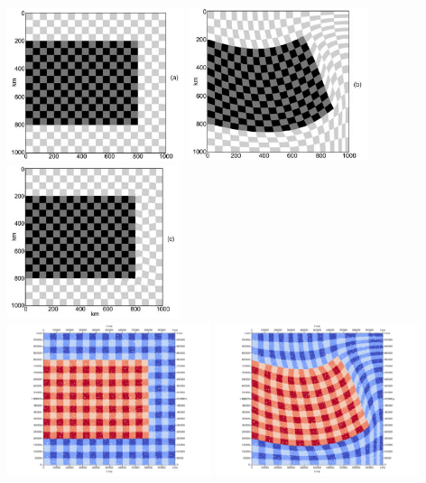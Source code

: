 \begin{center}
\includegraphics[height=4.5cm]{python_codes/fieldstone_64/images/gerya1}
\includegraphics[height=4.5cm]{python_codes/fieldstone_64/images/gerya2}
\includegraphics[height=4.5cm]{python_codes/fieldstone_64/images/gerya3}\\
\includegraphics[height=4.5cm]{python_codes/fieldstone_64/results/slab/markers0000}
\includegraphics[height=4.5cm]{python_codes/fieldstone_64/results/slab/markers0100}\\

\end{center}
